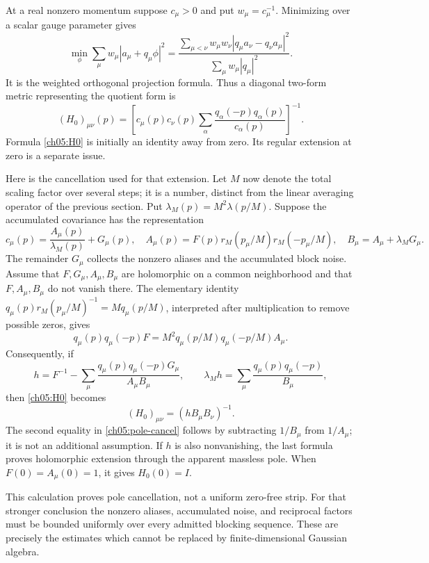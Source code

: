 At a real nonzero momentum suppose $c_\mu>0$ and put
$w_\mu=c_\mu^{-1}$. Minimizing over a scalar gauge parameter gives
\begin{equation}
 \min_\phi\sum_\mu w_\mu|a_\mu+q_\mu\phi|^2
 =\frac{\displaystyle\sum_{\mu<\nu}w_\mu w_\nu
                  |q_\mu a_\nu-q_\nu a_\mu|^2}
        {\displaystyle\sum_\mu w_\mu|q_\mu|^2}.
 \label{ch05:quotient}
\end{equation}
It is the weighted orthogonal projection formula. Thus a diagonal
two-form metric representing the quotient form is
\begin{equation}
 (H_0)_{\mu\nu}(p)=
 \left[c_\mu(p)c_\nu(p)
               \sum_\alpha\frac{q_\alpha(-p)q_\alpha(p)}
                                  {c_\alpha(p)}\right]^{-1}.
 \label{ch05:H0}
\end{equation}
Formula \eqref{ch05:H0} is initially an identity away from zero.
Its regular extension at zero is a separate issue.

Here is the cancellation used for that extension. Let $M$ now denote
the total scaling factor over several steps; it is a number, distinct from
the linear averaging operator of the previous section.
Put $\lambda_M(p)=M^2\lambda(p/M)$.
Suppose the accumulated covariance has the representation
\[
 c_\mu(p)=\frac{A_\mu(p)}{\lambda_M(p)}+G_\mu(p),
 \quad
 A_\mu(p)=F(p)r_M(p_\mu/M)r_M(-p_\mu/M),
 \quad B_\mu=A_\mu+\lambda_MG_\mu.
\]
The remainder $G_\mu$ collects the nonzero aliases and the
accumulated block noise. Assume that $F,G_\mu,A_\mu,B_\mu$ are
holomorphic on a common neighborhood and that $F,A_\mu,B_\mu$ do
not vanish there. The elementary identity
$q_\mu(p)r_M(p_\mu/M)^{-1}=M q_\mu(p/M)$, interpreted after
multiplication to remove possible zeros, gives
\[
 q_\mu(p)q_\mu(-p)F
       =M^2q_\mu(p/M)q_\mu(-p/M)A_\mu .
\]
Consequently, if
\begin{equation}
 h=F^{-1}-\sum_\mu
       \frac{q_\mu(p)q_\mu(-p)G_\mu}{A_\mu B_\mu},
 \qquad
 \lambda_M h=\sum_\mu\frac{q_\mu(p)q_\mu(-p)}{B_\mu},
 \label{ch05:pole-cancel}
\end{equation}
then \eqref{ch05:H0} becomes
\[
                 (H_0)_{\mu\nu}=(h B_\mu B_\nu)^{-1}.
\]
The second equality in \eqref{ch05:pole-cancel} follows by subtracting
$1/B_\mu$ from $1/A_\mu$; it is not an additional assumption.
If $h$ is also nonvanishing, the last formula proves holomorphic
extension through the apparent massless pole.
When $F(0)=A_\mu(0)=1$, it gives $H_0(0)=I$.

This calculation proves pole cancellation, not a uniform zero-free
strip. For that stronger conclusion the nonzero aliases,
accumulated noise, and reciprocal factors must be bounded uniformly
over every admitted blocking sequence. These are precisely the
estimates which cannot be replaced by finite-dimensional Gaussian
algebra.

